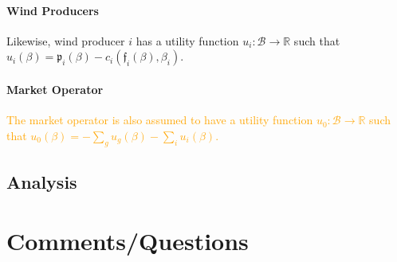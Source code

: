 \documentclass{article}
\begin{document}
\paragraph{Wind Producers} Likewise, wind producer $i$ has a utility function $u_i: \mathcal{B} \rightarrow \mathbb{R}$ such that $u_i(\beta) = \mathfrak{p}_i(\beta) - c_i(\mathfrak{f}_i(\beta), \beta_i)$.

\paragraph{Market Operator} \textcolor{orange}{The market operator is also assumed to have a utility function $u_0: \mathcal{B} \rightarrow \mathbb{R}$ such that $u_0(\beta) = - \sum_g u_g(\beta) - \sum_i u_i(\beta)$.}


\subsection{Analysis}

\section{Comments/Questions}
\end{document}

